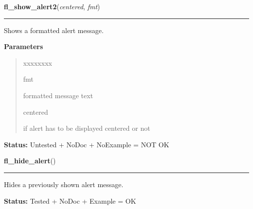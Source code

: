     \label{xformslib:library:fl_show_alert2}

    \vspace{0.5ex}

\hspace{.8\funcindent}\begin{boxedminipage}{\funcwidth}

    \raggedright \textbf{fl\_show\_alert2}(\textit{centered}, \textit{fmt})

    \vspace{-1.5ex}

    \rule{\textwidth}{0.5\fboxrule}
\setlength{\parskip}{2ex}
    Shows a formatted alert message.

\setlength{\parskip}{1ex}
      \textbf{Parameters}
      \vspace{-1ex}

      \begin{quote}
        \begin{Ventry}{xxxxxxxx}

          \item[fmt]

          formatted message text

          \item[centered]

          if alert has to be displayed centered or not

        \end{Ventry}

      \end{quote}

\textbf{Status:} Untested + NoDoc + NoExample = NOT OK



    \end{boxedminipage}

    \label{xformslib:library:fl_hide_alert}

    \vspace{0.5ex}

\hspace{.8\funcindent}\begin{boxedminipage}{\funcwidth}

    \raggedright \textbf{fl\_hide\_alert}()

    \vspace{-1.5ex}

    \rule{\textwidth}{0.5\fboxrule}
\setlength{\parskip}{2ex}
    Hides a previously shown alert message.

\setlength{\parskip}{1ex}
\textbf{Status:} Tested + NoDoc + Example = OK



    \end{boxedminipage}

